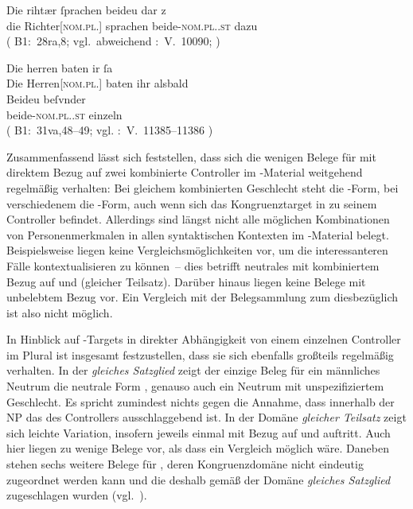 \begin{exe}
\ex \label{ex:richtherriu2}
	\begin{xlist}
	\ex \label{ex:richtherriu2_1}
		\gll Die rihtær ſprachen beideu {dar z} \\
			die Richter[\textsc{nom.pl.\MascM}] sprachen beide-\textsc{nom.pl.\NeutM.st}
			dazu \\
		\trans {}
			(%
				B1:~28ra,8; vgl.~abweichend
				\KC:~V.~10090;
				\cite[267]{schroeder1895}%
			)

	\ex \label{ex:richtherriu2_2}
		\gll Die herren baten ir ſa \\
			Die Herren[\textsc{nom.pl.\MascM}] baten ihr alsbald \\
	\sn \gll Beideu beſvnder \\
			beide-\textsc{nom.pl.\NeutM.st} einzeln \\
		\trans {}
			(%
				B1:~31va,48--49; vgl.
				\KC:~V.~11385--11386
				\cite[289]{schroeder1895}%
			)
	\end{xlist}
\end{exe}

Zusammenfassend lässt sich feststellen, dass sich die wenigen Belege für
 mit direktem Bezug auf zwei kombinierte Controller im
\KC{}-Material weitgehend regelmäßig verhalten: Bei gleichem
kombinierten Geschlecht steht die -Form, bei verschiedenem die
-Form, auch wenn sich das Kongruenztarget in  zu
seinem Controller befindet. Allerdings sind längst nicht alle möglichen
Kombinationen von Personenmerkmalen in allen syntaktischen Kontexten im
\KC{}-Material belegt. Beispielsweise liegen keine
Vergleichs\-möglich\-keiten vor, um die interessanteren Fälle kontextualisieren
zu können~-- dies betrifft neutrales  mit kombiniertem Bezug auf
  und  (gleicher Teilsatz). Darüber hinaus
liegen keine Belege mit unbelebtem Bezug vor. Ein Vergleich mit der
Belegsammlung zum \CAO{} diesbezüglich ist also nicht möglich.

In Hinblick auf -Targets in direkter Abhängigkeit von einem
einzelnen Controller im Plural ist insgesamt festzustellen, dass sie sich
ebenfalls großteils regelmäßig verhalten. In der  \emph{gleiches
Satzglied} zeigt der einzige Beleg für ein männliches Neutrum die neutrale Form
, genauso auch ein Neutrum mit unspezifiziertem Geschlecht. Es
spricht zumindest nichts gegen die Annahme, dass innerhalb der
NP das  des Controllers ausschlaggebend ist. In
der Domäne \emph{gleicher Teilsatz} zeigt sich leichte Variation, insofern
jeweils einmal  mit Bezug auf   und
  auftritt. Auch hier liegen zu wenige Belege vor,
als dass ein Vergleich möglich wäre. Daneben stehen sechs weitere Belege für
, deren Kongruenzdomäne nicht eindeutig zugeordnet
werden kann und die deshalb gemäß \citet[623]{ksw2} der Domäne \emph{gleiches
Satzglied} zugeschlagen wurden (vgl.~).

